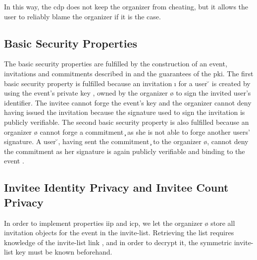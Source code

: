 \noindent In this way, the \acl{cdp} does not keep the organizer
from cheating, but it allows the user to reliably blame the organizer %
if it is the case.


\subsection{Basic Security Properties}
	\label{subsection:event-invitations-dosns:basic-security-properties}
The basic security properties are fulfilled by the construction of an event, invitations 
and commitments described in  and the guarantees 
of the \Ac{pki}. 
%
The first basic security property is fulfilled because an invitation \i{} for a user \u{} 
is created by using the event's private key \eS{}, owned by the organizer \o{} to 
sign the invited user's identifier. The invitee cannot forge the event's key and 
the organizer cannot deny having issued the invitation because 
the signature used to sign the invitation is publicly verifiable.
%
The second basic security property is also fulfilled because an organizer \o{} cannot forge 
a commitment \c{} as she is not able to forge another users' signature. A %
user \u{}, having sent the commitment \c{} to the organizer \o{}, cannot deny the 
commitment as her signature is again publicly verifiable and binding to the event \e{}.

\subsection{Invitee Identity Privacy and Invitee Count Privacy}
	\label{subsection:event-invitations-dosns:invitee-identity-and-count-privacy-properties}
In order to implement properties \Ac{iip} and \Ac{icp}, we let the organizer \o{} 
store all invitation objects for the event in the invite-list. 
Retrieving the list requires knowledge of the invite-list link \ILL{}, 
and in order to decrypt it, the symmetric invite-list key \ILK{} must be known 
beforehand.

